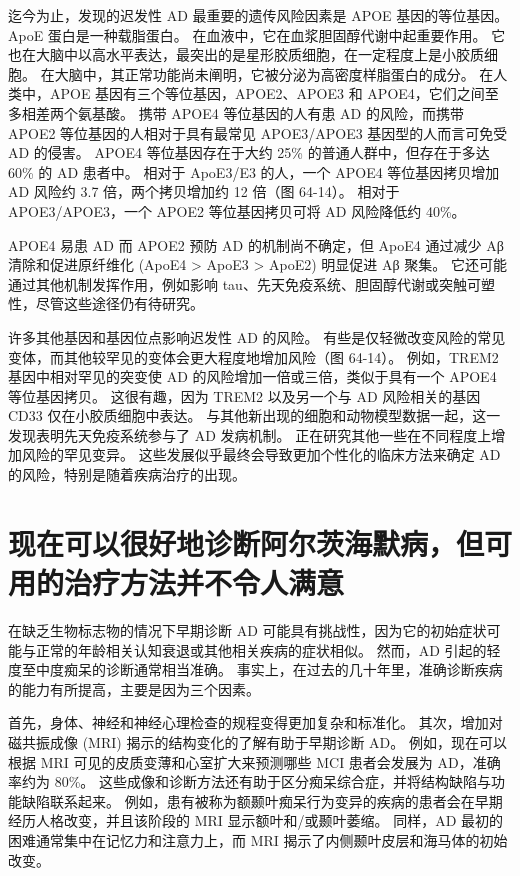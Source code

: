 迄今为止，发现的迟发性 AD 最重要的遗传风险因素是 APOE 基因的等位基因。 ApoE 蛋白是一种载脂蛋白。 在血液中，它在血浆胆固醇代谢中起重要作用。 它也在大脑中以高水平表达，最突出的是星形胶质细胞，在一定程度上是小胶质细胞。 在大脑中，其正常功能尚未阐明，它被分泌为高密度样脂蛋白的成分。 在人类中，APOE 基因有三个等位基因，APOE2、APOE3 和 APOE4，它们之间至多相差两个氨基酸。 携带 APOE4 等位基因的人有患 AD 的风险，而携带 APOE2 等位基因的人相对于具有最常见 APOE3/APOE3 基因型的人而言可免受 AD 的侵害。 APOE4 等位基因存在于大约 25\% 的普通人群中，但存在于多达 60\% 的 AD 患者中。 相对于 ApoE3/E3 的人，一个 APOE4 等位基因拷贝增加 AD 风险约 3.7 倍，两个拷贝增加约 12 倍（图 64-14）。 相对于 APOE3/APOE3，一个 APOE2 等位基因拷贝可将 AD 风险降低约 40\%。

APOE4 易患 AD 而 APOE2 预防 AD 的机制尚不确定，但 ApoE4 通过减少 Aβ 清除和促进原纤维化 (ApoE4 > ApoE3 > ApoE2) 明显促进 Aβ 聚集。 它还可能通过其他机制发挥作用，例如影响 tau、先天免疫系统、胆固醇代谢或突触可塑性，尽管这些途径仍有待研究。

许多其他基因和基因位点影响迟发性 AD 的风险。 有些是仅轻微改变风险的常见变体，而其他较罕见的变体会更大程度地增加风险（图 64-14）。 例如，TREM2 基因中相对罕见的突变使 AD 的风险增加一倍或三倍，类似于具有一个 APOE4 等位基因拷贝。 这很有趣，因为 TREM2 以及另一个与 AD 风险相关的基因 CD33 仅在小胶质细胞中表达。 与其他新出现的细胞和动物模型数据一起，这一发现表明先天免疫系统参与了 AD 发病机制。 正在研究其他一些在不同程度上增加风险的罕见变异。 这些发展似乎最终会导致更加个性化的临床方法来确定 AD 的风险，特别是随着疾病治疗的出现。


\section{现在可以很好地诊断阿尔茨海默病，但可用的治疗方法并不令人满意}

在缺乏生物标志物的情况下早期诊断 AD 可能具有挑战性，因为它的初始症状可能与正常的年龄相关认知衰退或其他相关疾病的症状相似。 然而，AD 引起的轻度至中度痴呆的诊断通常相当准确。 事实上，在过去的几十年里，准确诊断疾病的能力有所提高，主要是因为三个因素。

首先，身体、神经和神经心理检查的规程变得更加复杂和标准化。 其次，增加对磁共振成像 (MRI) 揭示的结构变化的了解有助于早期诊断 AD。 例如，现在可以根据 MRI 可见的皮质变薄和心室扩大来预测哪些 MCI 患者会发展为 AD，准确率约为 80\%。 这些成像和诊断方法还有助于区分痴呆综合症，并将结构缺陷与功能缺陷联系起来。 例如，患有被称为额颞叶痴呆行为变异的疾病的患者会在早期经历人格改变，并且该阶段的 MRI 显示额叶和/或颞叶萎缩。 同样，AD 最初的困难通常集中在记忆力和注意力上，而 MRI 揭示了内侧颞叶皮层和海马体的初始改变。

